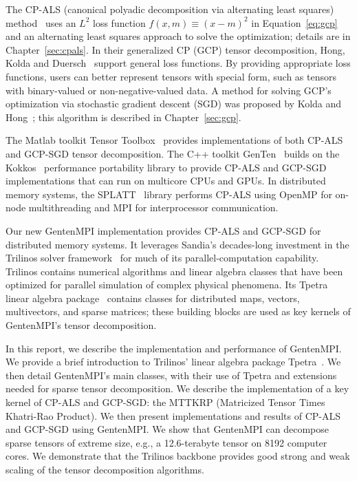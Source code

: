 The CP-ALS (canonical polyadic decomposition via alternating least squares) 
method~\cite{CC70,Harshman70} 
uses an $L^2$ loss function 
$f(x,m) \equiv (x-m)^2$ in Equation~\ref{eq:gcp} and an alternating
least squares approach to solve the optimization; details are in
Chapter~\ref{sec:cpals}.
In their generalized CP (GCP) tensor decomposition,
Hong, Kolda and Duersch~\cite{HKD18,HoKoDu20} support general 
loss functions.  By providing appropriate loss functions, users can 
better represent tensors with special form, such as tensors with binary-valued
or non-negative-valued data. A method for solving GCP's optimization
via stochastic gradient descent (SGD) was proposed by Kolda and 
Hong~\cite{KH19}; this algorithm is described in Chapter~\ref{sec:gcp}.

The Matlab toolkit Tensor Toolbox~\cite{TTB_Sparse,TensorToolbox} provides 
implementations of both CP-ALS and GCP-SGD tensor decomposition.
The C++ toolkit GenTen~\cite{GenTen,PK19} builds on the Kokkos~\cite{ETS14,Kokkos}
performance portability library to provide CP-ALS and GCP-SGD implementations
that can run on multicore CPUs and GPUs.
In distributed memory systems, the SPLATT~\cite{SK16,SPLATT} 
library performs CP-ALS using
OpenMP for on-node multithreading and MPI for interprocessor communication.

Our new GentenMPI implementation provides CP-ALS and GCP-SGD for distributed
memory systems.
It leverages Sandia's decades-long investment in the Trilinos solver
framework~\cite{Trilinos,HB+05} for much of its parallel-computation capability.  Trilinos contains
numerical algorithms and linear algebra classes that have been optimized for
parallel simulation of complex physical phenomena.  Its Tpetra linear 
algebra package~\cite{BH12,Tpetra} contains classes for distributed maps,
vectors, multivectors, and sparse matrices; these building blocks are used
as key kernels of GentenMPI's tensor decomposition.

In this report, we describe the implementation and performance of GentenMPI.
We provide a brief introduction to Trilinos' linear algebra
package Tpetra~\cite{BH12,Tpetra}.  We then detail GentenMPI's main classes, 
with their use of Tpetra and extensions needed 
for sparse tensor decomposition. 
We describe the implementation of a key kernel of CP-ALS and GCP-SGD: the 
MTTKRP (Matricized Tensor Times Khatri-Rao Product).
We then present implementations and results of CP-ALS and GCP-SGD using
GentenMPI.  We show that GentenMPI can 
decompose sparse tensors of extreme size, e.g., a 12.6-terabyte
tensor on 8192 computer cores.  We demonstrate that the Trilinos backbone 
provides good strong and weak scaling of the tensor decomposition algorithms.





